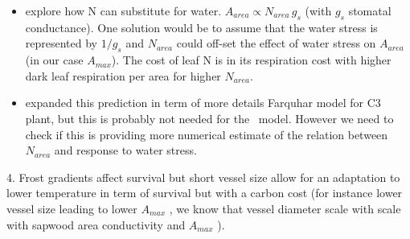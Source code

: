 \documentclass[a4paper,11pt]{article}
\begin{document}
\begin{itemize}
\item \citet{Wright-2003} explore how N can substitute for water. $A_{area} \propto N_{area} \, g_s$ (with $g_s$ stomatal conductance). One solution would be to assume that the water stress is represented by $1/g_s$ and $N_{area}$ could off-set the effect of water stress on $A_{area}$ (in our case $A_{max}$). The cost of leaf N is in its respiration cost with higher dark leaf respiration per area for higher $N_{area}$.

\item \citet{Prentice-2014} expanded this prediction in term of more details Farquhar model for C3 plant, but this is probably not needed for the \plant\ model. However we need to check if this is providing more numerical estimate of the relation between $N_{area}$ and response to water stress.
\end{itemize}

4. Frost gradients affect survival but
short vessel size allow for an adaptation to lower temperature in term
of survival but
with a carbon cost (for instance lower vessel size leading to lower
$A_{max}$ \citep{Poorter-2010}, we know that vessel diameter scale with scale with sapwood area conductivity and $A_{max}$ \citep{Chen-2009,Choat-2011}).
\end{document}

